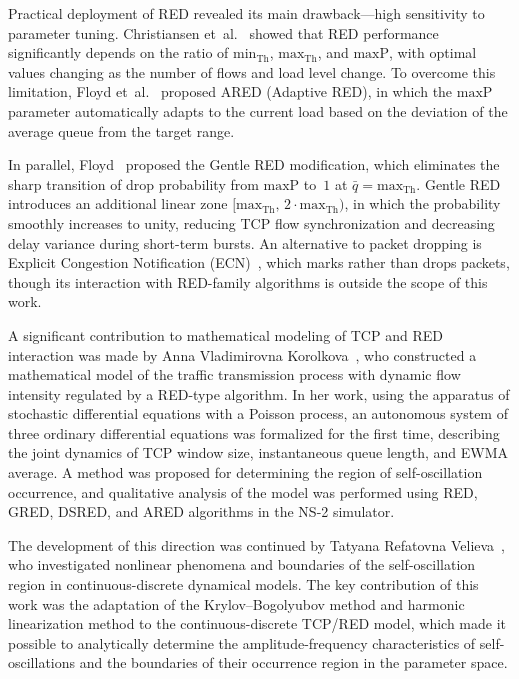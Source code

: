 \documentclass[default]{subfiles}
\begin{document}
{Practical deployment of RED revealed its main drawback---high sensitivity to parameter tuning. Christiansen et~al.~\cite{christiansen2001} showed that RED performance significantly depends on the ratio of $\mathrm{min}_{\mathrm{Th}}$, $\mathrm{max}_{\mathrm{Th}}$, and $\mathrm{maxP}$, with optimal values changing as the number of flows and load level change. To overcome this limitation, Floyd et~al.~\cite{floyd2001} proposed ARED (Adaptive RED), in which the $\mathrm{maxP}$ parameter automatically adapts to the current load based on the deviation of the average queue from the target range.

In parallel, Floyd~\cite{floyd2000} proposed the Gentle RED modification, which eliminates the sharp transition of drop probability from $\mathrm{maxP}$ to~$1$ at $\bar{q} = \mathrm{max}_{\mathrm{Th}}$. Gentle RED introduces an additional linear zone $[\mathrm{max}_{\mathrm{Th}},\, 2\cdot\mathrm{max}_{\mathrm{Th}})$, in which the probability smoothly increases to unity, reducing TCP flow synchronization and decreasing delay variance during short-term bursts. An alternative to packet dropping is Explicit Congestion Notification (ECN)~\cite{rfc3168}, which marks rather than drops packets, though its interaction with RED-family algorithms is outside the scope of this work.

A significant contribution to mathematical modeling of TCP and RED interaction was made by Anna Vladimirovna Korolkova~\cite{korolkova2010}, who constructed a mathematical model of the traffic transmission process with dynamic flow intensity regulated by a RED-type algorithm. In her work, using the apparatus of stochastic differential equations with a Poisson process, an autonomous system of three ordinary differential equations was formalized for the first time, describing the joint dynamics of TCP window size, instantaneous queue length, and EWMA average. A method was proposed for determining the region of self-oscillation occurrence, and qualitative analysis of the model was performed using RED, GRED, DSRED, and ARED algorithms in the NS-2 simulator.

The development of this direction was continued by Tatyana Refatovna Velieva~\cite{velieva2019}, who investigated nonlinear phenomena and boundaries of the self-oscillation region in continuous-discrete dynamical models. The key contribution of this work was the adaptation of the Krylov--Bogolyubov method and harmonic linearization method to the continuous-discrete TCP/RED model, which made it possible to analytically determine the amplitude-frequency characteristics of self-oscillations and the boundaries of their occurrence region in the parameter space.

}
\end{document}
